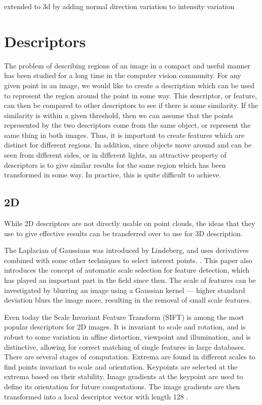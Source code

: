 \documentclass[11pt,a4paper]{kth-mag}
\begin{document}
\cite{zhong2009intrinsic}

\cite{smith1997susan} extended to 3d by adding normal direction variation to
intensity variation

\section{Descriptors}
The problem of describing regions of an image in a compact and useful manner has
been studied for a long time in the computer vision community. For any given
point in an image, we would like to create a description which can be used to
represent the region around the point in some way. This descriptor, or feature,
can then be compared to other descriptors to see if there is some similarity. If
the similarity is within a given threshold, then we can assume that the points
represented by the two descriptors come from the same object, or represent the
same thing in both images. Thus, it is important to create features which are
distinct for different regions. In addition, since objects move around and can
be seen from different sides, or in different lights, an attractive property of
descriptors is to give similar results for the same region which has been
transformed in some way. In practice, this is quite difficult to achieve.
\subsection{2D}
While 2D descriptors are not directly usable on point clouds, the ideas that
they use to give effective results can be transferred over to use for 3D
description.

The Laplacian of Gaussians was introduced by Lindeberg, and uses derivatives
combined with some other techniques to select interest points.
\cite{lindeberg1998feature}. This paper also introduces the concept of automatic
scale selection for feature detection, which has played an important part in the
field since then. The scale of features can be investigated by blurring an image
using a Gaussian kernel --- higher standard deviation blurs the image more,
resulting in the removal of small scale features.

Even today the Scale Invariant Feature Transform (SIFT) is among the most
popular descriptors for 2D images. It is invariant to scale and rotation, and is
robust to some variation in affine distortion, viewpoint and illumination, and
is distinctive, allowing for correct matching of single features in large
databases. There are several stages of computation. Extrema are found in
different scales to find points invariant to scale and orientation. Keypoints
are selected at the extrema based on their stability. Image gradients at the
keypoint are used to define its orientation for future computations. The image
gradients are then transformed into a local descriptor vector with length 128
\cite{lowe2004distinctive}.
\end{document}
